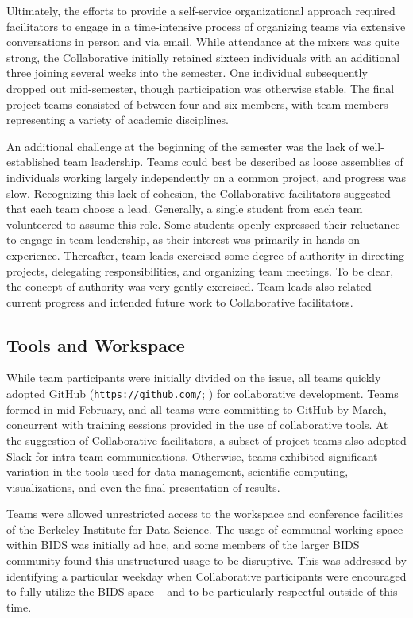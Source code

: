 \documentclass[12pt]{article}
\begin{document}
Ultimately, the efforts to provide a self-service organizational approach required facilitators to engage in a time-intensive process of organizing teams via extensive conversations in person and via email. While attendance at the mixers was quite strong, the Collaborative initially retained sixteen individuals with an additional three joining several weeks into the semester. One individual subsequently dropped out mid-semester, though participation was otherwise stable.  The final project teams consisted of between four and six members, with team members representing a variety of academic disciplines.  

An additional challenge at the beginning of the semester was the lack of well-established team leadership. Teams could best be described as loose assemblies of individuals working largely independently on a common project, and progress was slow. Recognizing this lack of cohesion, the Collaborative facilitators suggested that each team choose a lead.  Generally, a single student from each team volunteered to assume this role. Some students openly expressed their reluctance to engage in team leadership, as their interest was primarily in hands-on experience.  Thereafter, team leads exercised some degree of authority in directing projects, delegating responsibilities, and organizing team meetings.  To be clear, the concept of authority was very gently exercised.  Team leads also related current progress and intended future work to Collaborative facilitators.

\subsection{Tools and Workspace}

While team participants were initially divided on the issue, all teams quickly adopted GitHub (\texttt{https://github.com/}; \cite{dabbish2012social}) for collaborative development.  Teams formed in mid-February, and all teams were committing to GitHub by March, concurrent with training sessions provided in the use of collaborative tools.  At the suggestion of Collaborative facilitators, a subset of project teams also adopted Slack for intra-team communications.  Otherwise, teams exhibited significant variation in the tools used for data management, scientific computing, visualizations, and even the final presentation of results.

Teams were allowed unrestricted access to the workspace and conference facilities of the Berkeley Institute for Data Science.  The usage of communal working space within BIDS was initially ad hoc, and some members of the larger BIDS community found this unstructured usage to be disruptive. This was addressed by identifying a particular weekday when Collaborative participants were encouraged to fully utilize the BIDS space -- and to be particularly respectful outside of this time.
\end{document}
